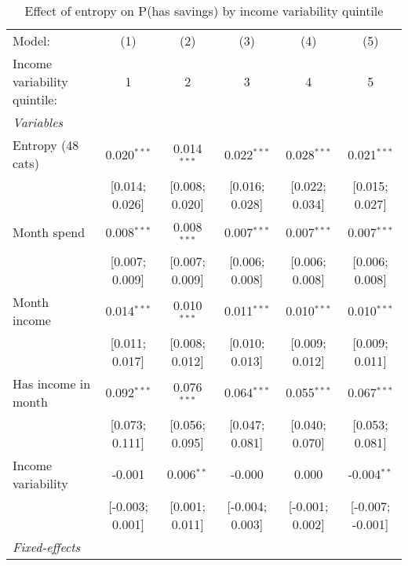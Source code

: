 
\begin{table}[htbp]
   \centering
   \tiny
   \begin{threeparttable}[b]
      \caption{\label{tab:reg_has_inflows_entropy_tag_spend_z_inc_var_quint} Effect of entropy on P(has savings) by income variability quintile}
      \begin{tabular}{lccccc}
         \tabularnewline \midrule \midrule
         Model:                       & (1)             & (2)            & (3)             & (4)             & (5)\\  
         Income variability quintile: & 1               & 2              & 3               & 4               & 5 \\   
         \midrule
         \emph{Variables}\\
         Entropy (48 cats)            & 0.020$^{***}$   & 0.014$^{***}$  & 0.022$^{***}$   & 0.028$^{***}$   & 0.021$^{***}$\\   
                                      & [0.014; 0.026]  & [0.008; 0.020] & [0.016; 0.028]  & [0.022; 0.034]  & [0.015; 0.027]\\   
         Month spend                  & 0.008$^{***}$   & 0.008$^{***}$  & 0.007$^{***}$   & 0.007$^{***}$   & 0.007$^{***}$\\   
                                      & [0.007; 0.009]  & [0.007; 0.009] & [0.006; 0.008]  & [0.006; 0.008]  & [0.006; 0.008]\\   
         Month income                 & 0.014$^{***}$   & 0.010$^{***}$  & 0.011$^{***}$   & 0.010$^{***}$   & 0.010$^{***}$\\   
                                      & [0.011; 0.017]  & [0.008; 0.012] & [0.010; 0.013]  & [0.009; 0.012]  & [0.009; 0.011]\\   
         Has income in month          & 0.092$^{***}$   & 0.076$^{***}$  & 0.064$^{***}$   & 0.055$^{***}$   & 0.067$^{***}$\\   
                                      & [0.073; 0.111]  & [0.056; 0.095] & [0.047; 0.081]  & [0.040; 0.070]  & [0.053; 0.081]\\   
         Income variability           & -0.001          & 0.006$^{**}$   & -0.000          & 0.000           & -0.004$^{**}$\\   
                                      & [-0.003; 0.001] & [0.001; 0.011] & [-0.004; 0.003] & [-0.001; 0.002] & [-0.007; -0.001]\\   
         \midrule
         \emph{Fixed-effects}\\

\end{tabular}
\end{threeparttable}
\end{table}
